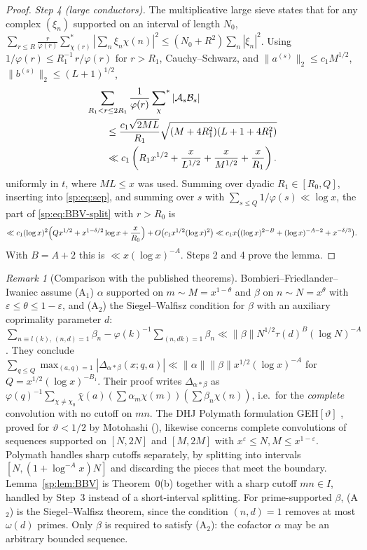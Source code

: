 \documentclass[final,11pt]{elsarticle}
\theoremstyle{definition}
\theoremstyle{remark}
\newtheorem{remark}[theorem]{Remark}
\numberwithin{equation}{section}
\begin{document}
\begin{proof}
\emph{Step 4 (large conductors).} The multiplicative large sieve
\cite[Ch.~27]{Davenport} states that for any complex $(\xi_n)$ supported on an
interval of length $N_0$,
$\sum_{r\le R}\frac{r}{\varphi(r)}\sum^*_{\chi\,(r)}|\sum_n\xi_n\chi(n)|^2\le(N_0+R^2)\sum_n|\xi_n|^2$.
Using $1/\varphi(r)\le R_1^{-1}\,r/\varphi(r)$ for $r>R_1$, Cauchy--Schwarz, and
$\|a^{(s)}\|_2\le c_1M^{1/2}$, $\|b^{(s)}\|_2\le(L+1)^{1/2}$,
\begin{align*}
 &\sum_{R_1<r\le2R_1}\frac1{\varphi(r)}
       \sideset{}{^*}\sum_{\chi}|\mathcal A_s\mathcal B_s|\\
 &\qquad\le\frac{c_1\sqrt{2ML}}{R_1}
   \sqrt{(M+4R_1^2)(L+1+4R_1^2)}\\
 &\qquad\ll c_1\left(R_1x^{1/2}+\frac{x}{L^{1/2}}
             +\frac{x}{M^{1/2}}+\frac{x}{R_1}\right).
\end{align*}
uniformly in $t$, where $ML\le x$ was used. Summing over dyadic
$R_1\in[R_0,Q]$, inserting into \eqref{sp:eq:sep}, and summing over $s$ with
$\sum_{s\le Q}1/\varphi(s)\ll\log x$, the part of \eqref{sp:eq:BBV-split} with
$r>R_0$ is
\[
 \ll c_1(\log x)^2\Bigl(Qx^{1/2}+x^{1-\delta/2}\log x+\frac{x}{R_0}\Bigr)
       +O\bigl(c_1x^{1/2}(\log x)^2\bigr)
 \ll c_1x\bigl((\log x)^{2-B}+(\log x)^{-A-2}+x^{-\delta/3}\bigr).
\]
With $B=A+2$ this is $\ll x(\log x)^{-A}$. Steps 2 and 4 prove the lemma.
\end{proof}

\begin{remark}[Comparison with the published theorems]\label{sp:rem:BFI}
Bombieri--Friedlander--Iwaniec \cite[Theorem~0(b), p.~212]{BFI86} assume
(A$_1$) $\alpha$ supported on $m\sim M=x^{1-\theta}$ and $\beta$ on $n\sim N=x^\theta$
with $\varepsilon\le\theta\le1-\varepsilon$, and (A$_2$) the Siegel--Walfisz
condition for $\beta$ with an auxiliary coprimality parameter $d$:
$\sum_{n\equiv l\,(k),\,(n,d)=1}\beta_n-\varphi(k)^{-1}\sum_{(n,dk)=1}\beta_n
\ll\|\beta\|N^{1/2}\tau(d)^B(\log N)^{-A}$. They conclude
$\sum_{q\le Q}\max_{(a,q)=1}|\Delta_{\alpha*\beta}(x;q,a)|\ll\|\alpha\|\|\beta\|x^{1/2}(\log x)^{-A}$
for $Q=x^{1/2}(\log x)^{-B_1}$. Their proof writes
$\Delta_{\alpha*\beta}$ as $\varphi(q)^{-1}\sum_{\chi\ne\chi_0}\bar\chi(a)
(\sum\alpha_m\chi(m))(\sum\beta_n\chi(n))$, i.e.\ for the \emph{complete}
convolution with no cutoff on $mn$. The DHJ Polymath formulation
GEH$[\vartheta]$ \cite[Claim~2.6]{Polymath2014}, proved for $\vartheta<1/2$ by
Motohashi \cite{Motohashi76} (\cite[Theorem~2.8]{Polymath2014}), likewise
concerns complete convolutions of sequences supported on $[N,2N]$ and $[M,2M]$
with $x^\varepsilon\le N,M\le x^{1-\varepsilon}$. Polymath handles sharp
cutoffs separately, by splitting into intervals $[N,(1+\log^{-A}x)N]$ and
discarding the pieces that meet the boundary. Lemma~\ref{sp:lem:BBV} is
Theorem~0(b) together with a sharp cutoff $mn\in I$, handled by Step~3 instead
of a short-interval splitting. For prime-supported $\beta$, (A$_2$) is the
Siegel--Walfisz theorem, since the condition $(n,d)=1$ removes at most
$\omega(d)$ primes. Only $\beta$ is required to satisfy (A$_2$): the cofactor
$\alpha$ may be an arbitrary bounded sequence.
\end{remark}
\end{document}
